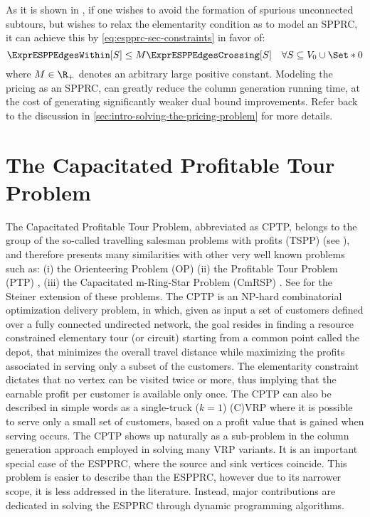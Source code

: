 As it is shown in \textcite{beasley1989},
if one wishes to avoid the formation of spurious unconnected subtours,
but wishes to relax the elementarity condition as to model an SPPRC,
it can achieve this by \cref{eq:espprc-sec-constraints} in favor of:
\begin{equation}
	\ExprESPPEdgesWithin[S] \le M \ExprESPPEdgesCrossing[S] \quad \forall S \subseteq V_0 \cup \Set*{0}
\end{equation}
where $M \in \R_+$ denotes an arbitrary large positive constant.
Modeling the pricing as an SPPRC, can greatly reduce
the column generation running time, at the cost
of generating significantly weaker dual bound improvements.
Refer back to the discussion in \cref{sec:intro-solving-the-pricing-problem}
for more details.

\section{The Capacitated Profitable Tour Problem}
\label{sec:the-capacitated-profitable-tour-problem}

The Capacitated Profitable Tour Problem, abbreviated as CPTP,
belongs to the group of the so-called travelling salesman
problems with profits (TSPP) (see \cite{feillet2005}),
and therefore presents many similarities with other very well known
problems such as:
(i) the Orienteering Problem (OP) \parencite{golden1987, laporte1990}
(ii) the Profitable Tour Problem (PTP) \parencite{dellamico1995},
(iii) the Capacitated m-Ring-Star Problem (CmRSP) \parencite{baldacci2007capacitated}.
See \textcite{letchford2013} for the Steiner extension of these problems.
The CPTP is an NP-hard combinatorial optimization delivery problem,
in which,
given as input a set of customers
defined over a fully connected undirected network, the goal resides in finding
a resource constrained elementary tour (or circuit) starting from a common point called the depot,
that minimizes the overall travel distance while maximizing
the profits associated in serving only a subset of the customers.
The elementarity constraint dictates that no vertex
can be visited twice or more, thus implying that the earnable profit
per customer is available only once.
The CPTP can also be described in simple words
as a single-truck ($k = 1$) (C)VRP where it is possible to serve only a small set of customers,
based on a profit value that is gained when serving occurs.
The CPTP shows up naturally as a sub-problem in the column generation approach employed in solving many VRP variants.
It is an important special case of the ESPPRC, where the source and sink vertices coincide.
This problem is easier to describe than the ESPPRC,
however due to its narrower scope,
it is less addressed in the literature.
Instead, major contributions are dedicated in solving the ESPPRC through dynamic programming algorithms.

